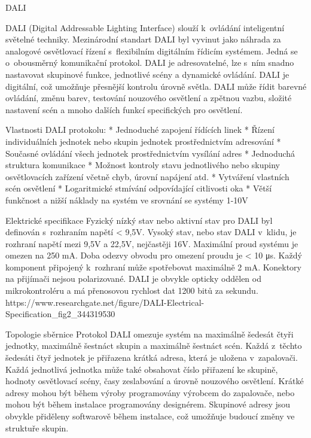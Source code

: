 \chap DALI



DALI (Digital Addressable Lighting Interface) slouží k~ovládání inteligentní světelné techniky.
Mezinárodní standart DALI byl vyvinut jako náhrada za analogové osvětlovací řízení s~flexibilním
digitálním řídicím systémem. Jedná se o~obousměrný komunikační protokol.
DALI je adresovatelné, lze s~ním snadno nastavovat skupinové funkce, jednotlivé scény a dynamické ovládání.
DALI je digitální, což umožňuje přesnější kontrolu úrovně světla.
DALI může řídit barevné ovládání, změnu barev, testování nouzového osvětlení a zpětnou vazbu,
složité nastavení scén a mnoho dalších funkcí specifických pro osvětlení.

\medskip
Vlastnosti DALI protokolu:
\begitems
    * Jednoduché zapojení řídících linek
    * Řízení individuálních jednotek nebo skupin jednotek prostřednictvím adresování
    * Současné ovládání všech jednotek prostřednictvím vysílání adres
    * Jednoduchá struktura komunikace
    * Možnost kontroly stavu jednotlivého nebo skupiny osvětlovacích zařízení včetně chyb, úrovní napájení atd.
    * Vytváření vlastních scén osvětlení
    * Logaritmické stmívání odpovídající citlivosti oka
    * Větší funkčnost a nižší náklady na systém ve srovnání se systémy 1-10V
\enditems

\sec Elektrické specifikace
Fyzický nízký stav nebo aktivní stav pro DALI byl definován s~rozhraním napětí < 9,5V. Vysoký stav, nebo stav
DALI v~klidu, je rozhraní napětí mezi 9,5V a 22,5V, nejčastěji 16V. Maximální proud systému je omezen na 250 mA.
Doba odezvy obvodu pro omezení proudu je < 10 μs. Každý komponent připojený k~rozhraní může spotřebovat maximálně 2 mA.
Konektory na přijímači nejsou polarizované. DALI je obvykle opticky oddělen od mikrokontroléru a má přenosovou
rychlost dat 1200 bitů za sekundu.
\medskip
https://www.researchgate.net/figure/DALI-Electrical-Specification_fig2_344319530
\medskip

\sec Topologie sběrnice
Protokol DALI omezuje systém na maximálně šedesát čtyři jednotky, maximálně šestnáct skupin a maximálně šestnáct scén.
Každá z~těchto šedesáti čtyř jednotek je přiřazena krátká adresa, která je uložena v~zapalovači.
Každá jednotlivá jednotka může také obsahovat číslo přiřazení ke skupině, hodnoty osvětlovací scény,
časy zeslabování a úrovně nouzového osvětlení. Krátké adresy mohou být během výroby programovány výrobcem
do zapalovače, nebo mohou být během instalace programovány designérem. Skupinové adresy jsou obvykle
přiděleny softwarově během instalace, což umožňuje budoucí změny ve struktuře skupin.

